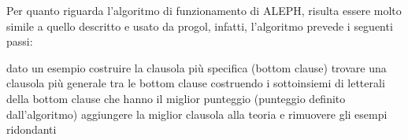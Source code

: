 Per quanto riguarda l'algoritmo di funzionamento di ALEPH, risulta essere molto simile a quello descritto e usato da progol, infatti, l'algoritmo prevede i seguenti passi:

\begin{algorithm}
	\begin{algorithmic}[1]
		\STATE dato un esempio costruire la clausola più specifica (bottom clause)
		\STATE trovare una clausola più generale tra le bottom clause costruendo i sottoinsiemi di letterali della bottom clause che hanno il miglior punteggio (punteggio definito dall'algoritmo)
		\STATE aggiungere la miglior clausola alla teoria e rimuovere gli esempi ridondanti 
		\ENDFOR
	\end{algorithmic}
\end{algorithm}

\nocite{aleph}